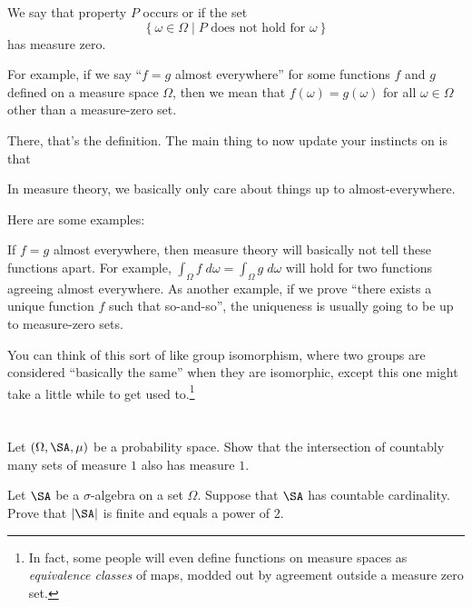 \begin{definition}
	We say that property $P$ occurs
	 or  if the set
	\[ \left\{ \omega \in \Omega \mid \text{$P$ does not hold for $\omega$} \right\} \]
	has measure zero.
\end{definition}

For example, if we say ``$f = g$ almost everywhere''
for some functions $f$ and $g$ defined on a measure space $\Omega$,
then we mean that $f(\omega) = g(\omega)$ for all $\omega \in \Omega$
other than a measure-zero set.

There, that's the definition.
The main thing to now update your instincts on is that
\begin{moral}
	In measure theory,
	we basically only care about things up to almost-everywhere.
\end{moral}
Here are some examples:
\begin{itemize}
	\ii If $f=g$ almost everywhere,
	then measure theory will basically not tell these functions apart.
	For example, $\int_\Omega f \; d\omega = \int_\Omega g \; d\omega$
	will hold for two functions agreeing almost everywhere.
	\ii As another example,
	if we prove ``there exists a unique function $f$ such that so-and-so'',
	the uniqueness is usually going to be up to measure-zero sets.
\end{itemize}
You can think of this sort of like group isomorphism,
where two groups are considered ``basically the same'' when they are isomorphic,
except this one might take a little while to get used to.\footnote{In fact,
	some people will even define functions on measure spaces
	as \emph{equivalence classes} of maps,
	modded out by agreement outside a measure zero set.}

\section{\problemhead}
\begin{dproblem}
	Let $(\Omega, \SA, \mu)$ be a probability space.
	Show that the intersection of countably many sets of measure $1$
	also has measure $1$.
\end{dproblem}

\begin{problem}
	\onechili
	Let $\SA$ be a $\sigma$-algebra on a set $\Omega$.
	Suppose that $\SA$ has countable cardinality.
	Prove that $|\SA|$ is finite and equals a power of $2$.
\end{problem}
